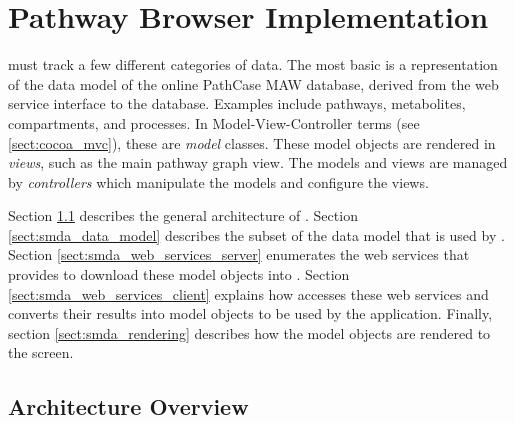 \section{Pathway Browser Implementation}
\label{sect:maw_implementation}

\mawapp must track a few different categories of data. The most basic is a
representation of the data model of the online PathCase MAW database, derived
from the web service interface to the database. Examples include pathways,
metabolites, compartments, and processes. In Model-View-Controller terms (see
\ref{sect:cocoa_mvc}), these are \emph{model} classes.  These model
objects are rendered in \emph{views}, such as the main pathway graph view.
The models and views are managed by \emph{controllers} which manipulate the
models and configure the views.

Section \ref{sect:smda_arch_overview} describes the general architecture of
\mawapp. Section \ref{sect:smda_data_model} describes the subset of the
\pathcasemaw data model that is used by \mawapp. Section
\ref{sect:smda_web_services_server} enumerates the web services that
\pathcasemaw provides to download these model objects into \mawapp. Section
\ref{sect:smda_web_services_client} explains how \mawapp accesses these web
services and converts their results into model objects to be used by the
application. Finally, section \ref{sect:smda_rendering} describes how the model
objects are rendered to the screen.

\subsection{Architecture Overview}
\label{sect:smda_arch_overview}

